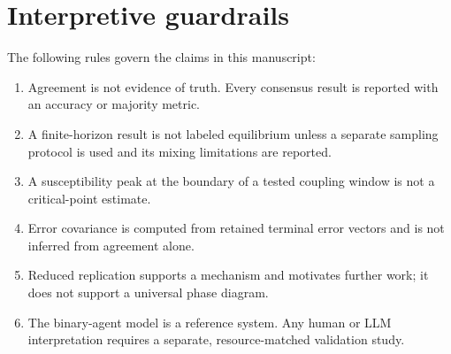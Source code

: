 \documentclass[11pt,a4paper]{article}
\begin{document}
\section{Interpretive guardrails}

The following rules govern the claims in this manuscript:

\begin{enumerate}
  \item Agreement is not evidence of truth. Every consensus result is reported with an accuracy or majority metric.
  \item A finite-horizon result is not labeled equilibrium unless a separate sampling protocol is used and its mixing limitations are reported.
  \item A susceptibility peak at the boundary of a tested coupling window is not a critical-point estimate.
  \item Error covariance is computed from retained terminal error vectors and is not inferred from agreement alone.
  \item Reduced replication supports a mechanism and motivates further work; it does not support a universal phase diagram.
  \item The binary-agent model is a reference system. Any human or LLM interpretation requires a separate, resource-matched validation study.
\end{enumerate}



\end{document}

